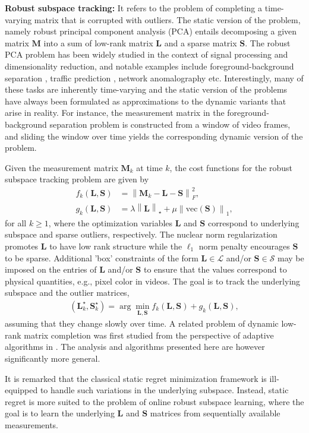 \documentclass[draftcls,onecolumn,12pt]{IEEEtran}
\theoremstyle{plain}
\def\L{\mathbf{L}}
\def\M{\mathbf{M}}
\def\S{\mathbf{S}}
\def\cS{\mathcal{S}}
\def\cL{\mathcal{L}}
\providecommand{\norm}[1]{\left\|#1\right\|}
\providecommand{\vect}[1]{\text{vec}\left(#1\right)}
\theoremstyle{plain}
\theoremstyle{remark}
\begin{document}
\textbf{Robust subspace tracking:} It refers to the problem of completing a time-varying matrix that is corrupted with outliers. The static version of the problem, namely robust principal component analysis (PCA) entails decomposing a given matrix $\M$ into a sum of low-rank matrix $\L$ and a sparse matrix $\S$. The robust PCA problem has been widely studied in the context of signal processing and dimensionality reduction, and notable examples include {foreground-background separation \cite{he2012incremental}, traffic prediction \cite{qiu2011reprocs}, network anomalography \cite{kasai2016network} etc.} Interestingly, many of these tasks are inherently time-varying and the static version of the problems have always been formulated as approximations to the dynamic variants that arise in reality. For instance, the measurement matrix in the foreground-background separation problem is constructed from a window of video frames, and sliding the window over time yields the corresponding dynamic version of the problem. 

Given the measurement matrix $\M_k$ at time $k$, the cost functions for the robust subspace tracking problem are given by 
\begin{align}
f_k(\L,\S) &= \norm{\M_k-\L-\S}_F^2, \\
g_k(\L,\S) &= \lambda\norm{\L}_{\star} + \mu\norm{\vect{\S}}_1,	
\end{align}
for all $k \geq 1$, where the optimization variables $\L$ and $\S$ correspond to underlying subspace and sparse outliers, respectively. The nuclear norm regularization promotes $\L$ to have low rank structure while the $\ell_1$ norm penalty encourages $\S$ to be sparse. Additional 'box' constraints of the form $\L\in\cL$ and/or $\S \in \cS$ may be imposed on the entries of $\L$ and/or $\S$ to ensure that the values correspond to physical quantities, e.g., pixel color in videos. The goal is to track the underlying subspace and the outlier matrices,
\begin{align}
(\L_k^\star,\S_k^\star) = \arg\min_{\L,\S} f_k(\L,\S) + g_k(\L,\S), \label{rst}
\end{align}
assuming that they change slowly over time. A related problem of dynamic low-rank matrix completion was first studied from the perspective of adaptive algorithms in \cite{tripathi2017adaptive}. The analysis and algorithms presented here are however significantly more general. 

It is remarked that the classical static regret minimization framework is ill-equipped to handle such variations in the underlying subspace. Instead, static regret is more suited to the problem of online robust subspace learning, where the goal is to learn the underlying $\L$ and $\S$ matrices from sequentially available measurements. 
\end{document}

